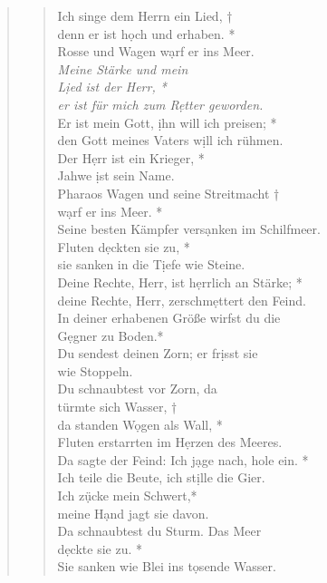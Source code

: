 



\vspace{0.3cm}
\def\greinitialformat#1{{\fontsize{40}{40}\selectfont #1}}
\gresetfirstlineaboveinitial{\small \textcolor{red}{Ex 15}}{}
\setaboveinitialseparation{0.72mm}

\vspace{0.3cm}


\begin{quote}
\begin{verse}


Ich singe dem Herrn ein Lied, †\\
denn er ist h\d och und erhaben. *\\ 
Rosse und Wagen w\d arf er ins Meer.\\
\vin \textit{Meine Stärke und mein \\ \vin L\d ied ist der Herr, *\\
\vin er ist für mich zum R\d etter geworden.} \\
Er ist mein Gott, \d ihn will ich preisen; *\\ 
den Gott meines Vaters w\d ill ich rühmen. \\
\vin Der H\d err ist ein Krieger, *\\
\vin Jahwe \d ist sein Name.\\
Pharaos Wagen und seine Streitmacht †\\
w\d arf er ins Meer. *\\ 
Seine besten Kämpfer vers\d anken im Schilfmeer.\\
\vin Fluten d\d eckten sie zu, *\\
\vin sie sanken in die T\d iefe wie Steine.\\
Deine Rechte, Herr, ist h\d errlich an Stärke; *\\
deine Rechte, Herr, zerschm\d ettert den Feind.\\
\vin In deiner erhabenen Größe wirfst  du die \\ \vin G\d egner zu Boden.*\\
\vin Du sendest deinen Zorn; er  fr\d isst sie \\ \vin wie Stoppeln.\\
Du schnaubtest vor Zorn, da  \\türmte sich Wasser, †\\
 da standen W\d ogen als Wall, *\\
Fluten erstarrten im H\d erzen des Meeres.\\
\vin Da sagte der Feind:  Ich j\d age nach, hole ein. *\\
\vin Ich teile die Beute, ich st\d ille die Gier. \\
 Ich z\d ücke mein Schwert,*\\
 meine H\d and jagt sie davon.\\
\vin Da schnaubtest du Sturm. Das  Meer \\ \vin d\d eckte sie zu. *\\
\vin Sie sanken wie Blei ins t\d osende Wasser.\\


\end{verse}
\end{quote}
